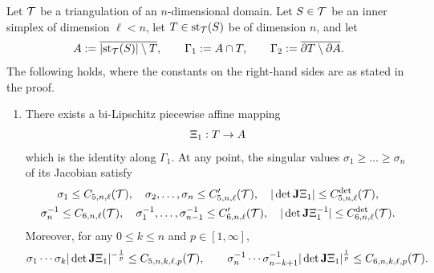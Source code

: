 \documentclass[10pt,a4paper]{article}
\begin{document}
\begin{proposition}\label{proposition:starreflection}
    Let ${\mathcal T}$ be a triangulation of an $n$-dimensional domain. 
    Let $S \in {\mathcal T}$ be an inner simplex of dimension $\ell < n$,
    let $T \in \operatorname{st}_{{\mathcal T}}(S)$ be of dimension $n$,
    and let 
    \begin{align*}
        A := \overline{ \left| \operatorname{st}_{{\mathcal T}}(S) \right| \setminus T },
        \qquad 
        {\Gamma_1} := A \cap T,
        \qquad 
        {\Gamma_2} := \overline{ \partial T \setminus \partial A }.
    \end{align*}
    The following holds, where the constants on the right-hand sides are as stated in the proof. 
    \begin{enumerate}
    \item 
    There exists a bi-Lipschitz piecewise affine mapping
    \begin{align*}
        \Xi_{1} : T \rightarrow A
    \end{align*}
    which is the identity along ${\Gamma_1}$. 
    At any point, the singular values $\sigma_1 \geq \dots \geq \sigma_n$ of its Jacobian satisfy 
    \begin{gather*}
        \sigma_1 \leq C_{5,n,\ell}({\mathcal T}),
        \quad 
        \sigma_2,\dots,\sigma_n \leq C'_{5,n,\ell}({\mathcal T}),
        \quad 
        | \det{\mathbf{J}}\Xi_{1} |      \leq C^{\det}_{5,n,\ell}({\mathcal T}),
        \\
        \sigma_n^{-1} \leq C_{6,n,\ell}({\mathcal T}),
        \quad 
        \sigma_1^{-1},\dots,\sigma_{n-1}^{-1} \leq C'_{6,n,\ell}({\mathcal T}),
        \quad 
        | \det{\mathbf{J}}\Xi_{1}^{-1} | \leq C^{\det}_{6,n,\ell}({\mathcal T}).
    \end{gather*}
    Moreover, for any $0 \leq k \leq n$ and $p \in [1,\infty]$,
    \begin{align*}
        \sigma_{1}\cdots\sigma_{k} | \det{\mathbf{J}}\Xi_{1} |^{-\frac 1 p}
        \leq 
        C_{5,n,k,\ell,p}({\mathcal T}),
        \qquad 
        \sigma_{n}^{-1}\cdots\sigma_{n-k+1}^{-1} | \det{\mathbf{J}}\Xi_{1} |^{\frac 1 p}
        \leq 
        C_{6,n,k,\ell,p}({\mathcal T}).
    \end{align*}


\end{enumerate}
\end{proposition}
\end{document}
